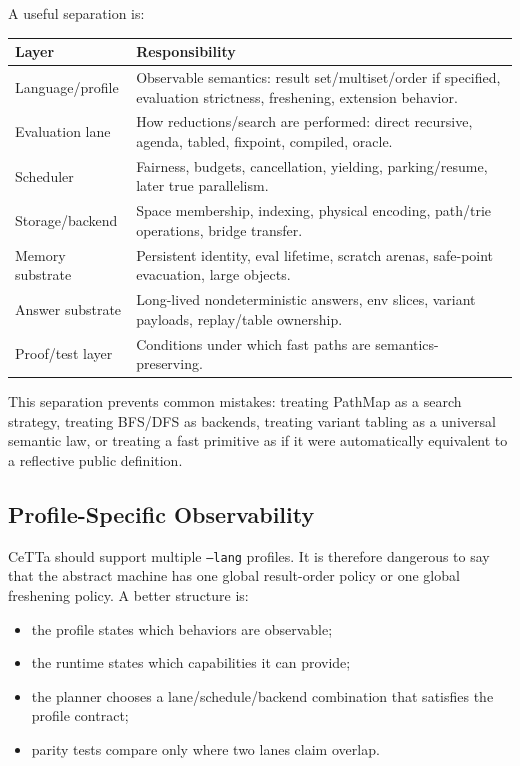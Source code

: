 \documentclass[11pt]{article}
\newcommand{\CeTTa}{CeTTa}
\newcommand{\PathMap}{PathMap}
\begin{document}
A useful separation is:

\begin{longtable}{>{\raggedright\arraybackslash}p{} >{\raggedright\arraybackslash}p{}}
\toprule
Layer & Responsibility \\
\midrule
Language/profile & Observable semantics: result set/multiset/order if specified, evaluation strictness, freshening, extension behavior. \\
Evaluation lane & How reductions/search are performed: direct recursive, agenda, tabled, fixpoint, compiled, oracle. \\
Scheduler & Fairness, budgets, cancellation, yielding, parking/resume, later true parallelism. \\
Storage/backend & Space membership, indexing, physical encoding, path/trie operations, bridge transfer. \\
Memory substrate & Persistent identity, eval lifetime, scratch arenas, safe-point evacuation, large objects. \\
Answer substrate & Long-lived nondeterministic answers, env slices, variant payloads, replay/table ownership. \\
Proof/test layer & Conditions under which fast paths are semantics-preserving. \\
\bottomrule
\end{longtable}

This separation prevents common mistakes: treating \PathMap{} as a search strategy, treating BFS/DFS as backends, treating variant tabling as a universal semantic law, or treating a fast primitive as if it were automatically equivalent to a reflective public definition.

\subsection{Profile-Specific Observability}

\CeTTa{} should support multiple \texttt{--lang} profiles.  It is therefore dangerous to say that the abstract machine has one global result-order policy or one global freshening policy.  A better structure is:

\begin{itemize}[leftmargin=*]
  \item the profile states which behaviors are observable;
  \item the runtime states which capabilities it can provide;
  \item the planner chooses a lane/schedule/backend combination that satisfies the profile contract;
  \item parity tests compare only where two lanes claim overlap.
\end{itemize}
\end{document}
